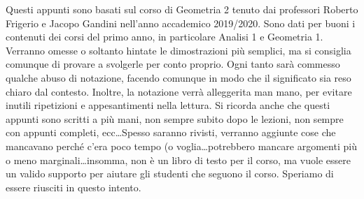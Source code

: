 Questi appunti sono basati sul corso di Geometria 2 tenuto dai professori
Roberto Frigerio e Jacopo Gandini nell'anno accademico 2019/2020. Sono dati per
buoni i contenuti dei corsi del primo anno, in particolare Analisi 1 e Geometria
1. Verranno omesse o soltanto hintate le dimostrazioni più semplici, ma si
consiglia comunque di provare a svolgerle per conto proprio. Ogni tanto sarà
commesso qualche abuso di notazione, facendo comunque in modo che il significato
sia reso chiaro dal contesto. Inoltre, la notazione verrà alleggerita man mano,
per evitare inutili ripetizioni e appesantimenti nella lettura. Si ricorda anche
che questi appunti sono scritti a più mani, non sempre subito dopo le lezioni,
non sempre con appunti completi, ecc\dots Spesso saranno rivisti, verranno
aggiunte cose che mancavano perché c'era poco tempo (o voglia\dots potrebbero
mancare argomenti più o meno marginali\dots insomma, non è un libro di testo per
il corso, ma vuole essere un valido supporto per aiutare gli studenti che
seguono il corso. Speriamo di essere riusciti in questo intento.

